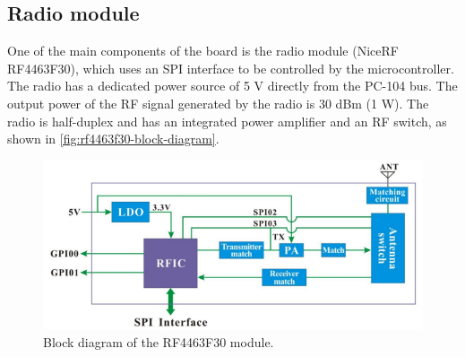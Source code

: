 \subsection{Radio module}

One of the main components of the board is the radio module (NiceRF RF4463F30), which uses an SPI interface to be controlled by the microcontroller. The radio has a dedicated power source of 5 V directly from the PC-104 bus. The output power of the RF signal generated by the radio is 30 dBm (1 W). The radio is half-duplex and has an integrated power amplifier and an RF switch, as shown in \autoref{fig:rf4463f30-block-diagram}.

\begin{figure}[!ht]
    \begin{center}
        \includegraphics[width=\textwidth]{figures/rf4463f30-block-diagram.png}
        \caption{Block diagram of the RF4463F30 module.}
        \label{fig:rf4463f30-block-diagram}
    \end{center}
\end{figure}
